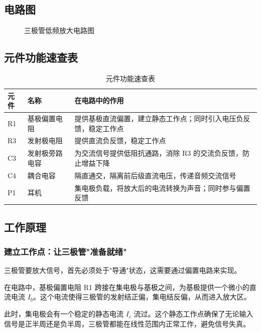 \documentclass[12pt,UTF8]{ctexbook}
\begin{document}
\subsection{电路图}

\begin{figure}[H]
	\centering
	\caption{三极管低频放大电路图}
	\label{fig:amplifier-circuit}
\end{figure}

\subsection{元件功能速查表}

\begin{table}[H]
	\centering
	\begin{tabular}{|l|l|l|}
		\hline
		元件 & 名称 & 在电路中的作用 \\
		\hline
		R1 & 基极偏置电阻 & 提供基极直流偏置，建立静态工作点；同时引入电压负反馈，稳定工作点 \\
		\hline
		R3 & 发射极电阻 & 提供直流负反馈，稳定工作点 \\
		\hline
		C3 & 发射极旁路电容 & 为交流信号提供低阻抗通路，消除 R3 的交流负反馈，防止增益下降 \\
		\hline
		C4 & 耦合电容 & 隔直通交，隔离前后级直流电压，传递音频交流信号 \\
		\hline
		P1 & 耳机 & 集电极负载，将放大后的电流转换为声音；同时参与偏置反馈 \\
		\hline
	\end{tabular}
	\caption{元件功能速查表}
	\label{tab:amplifier-components}
\end{table}

\subsection{工作原理}

\subsubsection{建立工作点：让三极管"准备就绪"}

三极管要放大信号，首先必须处于"导通"状态，这需要通过偏置电路来实现。

在电路中，基极偏置电阻 R1 跨接在集电极与基极之间，为基极提供一个微小的直流电流 $I_b$。这个电流使得三极管的发射结正偏，集电结反偏，从而进入放大区。

此时，集电极会有一个稳定的静态电流 $I_c$ 流过。这个静态工作点确保了无论输入信号是正半周还是负半周，三极管都能在线性范围内正常工作，避免信号失真。
\end{document}
